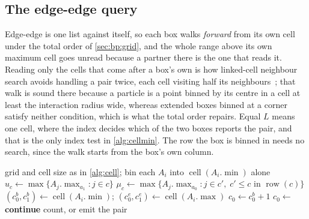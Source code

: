 \subsection{The edge-edge query}
\label{sec:bp:self}

Edge-edge is one list against itself, so each box walks \emph{forward} from its
own cell under the total order of \cref{sec:bp:grid}, and the whole range above
its own maximum cell goes unread because a partner there is the one that reads
it. Reading only the cells that come after a box's own is how linked-cell
neighbour search avoids handling a pair twice, each cell visiting half its
neighbours~\citep{allen2017liquids}; that walk is sound there because a particle
is a point binned by its centre in a cell at least the interaction radius wide,
whereas extended boxes binned at a corner satisfy neither condition, which is
what the total order repairs. Equal $L$ means one cell, where the index decides
which of the two boxes reports the pair, and that is the only index test in
\cref{alg:cellmin}. The row the box is binned in needs no search, since the
walk starts from the box's own column.

\begin{algorithm}[htbp]
\caption{The edge-edge query, one pass (count or fill)}
\label{alg:cellmin}
\small
\begin{algorithmic}[1]
  \State grid and cell size as in \cref{alg:cell}; bin each $A_{i}$ into
         $\operatorname{cell}(A_{i}.\min)$ alone
  \State $u_{c} \gets \max\{A_{j}.\max_{a_{1}} : j \in c\}$
  \State $\mu_{c} \gets \max\{A_{j}.\max_{a_{0}} : j \in c',\; c' \le c \text{ in } \operatorname{row}(c)\}$
    \State $(c_{0}^{b},c_{1}^{b}) \gets \operatorname{cell}(A_{i}.\min)$;\quad
           $(c_{0}^{e},c_{1}^{e}) \gets \operatorname{cell}(A_{i}.\max)$
      \State {} 
    \EndFor
       $c_{0} \gets c_{0}^{b} + 1$
      \Else{} $c_{0} \gets$ 
      \EndIf
         \textbf{continue}
        \EndIf
         
        \EndFor
      \EndFor
    \EndFor
  \EndFor
\EndFunction
{}
   \Return \EndIf
  \State count, or emit the pair
\EndFunction
\end{algorithmic}
\end{algorithm}


